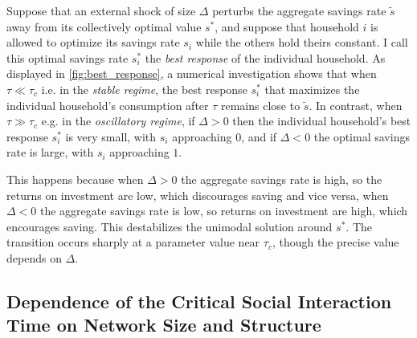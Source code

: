 Suppose that an external shock of size $\Delta$ perturbs the aggregate savings rate $\tilde{s}$ away from its collectively optimal value $s^\ast$, and suppose that household $i$ is allowed to optimize its savings rate $s_i$ while the others hold theirs constant. 
I call this optimal savings rate $s^*_i$ the \emph{best response} of the individual household. 
As displayed in \cref{fig:best_response}, a numerical investigation shows that when $\tau \ll \tau_{c}$ i.e. in the \emph{stable regime}, the best response $s^*_i$ that maximizes the individual household's consumption after $\tau$ remains close to $\tilde{s}$. 
In contrast, when  $\tau \gg \tau_{c}$ e.g. in the \emph{oscillatory regime}, if $\Delta > 0$ then the individual household's best response $s^*_i$ is very small, with $s_i$ approaching $0$, and if $\Delta < 0$ the optimal savings rate is large, with $s_i$ approaching $1$. 

This happens because when $\Delta > 0$ the aggregate savings rate is high, so the returns on investment are low, which discourages saving and vice versa, when $\Delta < 0$ the aggregate savings rate is low, so returns on investment are high, which encourages saving. 
This destabilizes the unimodal solution around $s^\ast$. 
The transition occurs sharply at a parameter value near $\tau_{c}$, though the precise value depends on $\Delta$.
\subsection{Dependence of the Critical Social Interaction Time on Network Size and Structure}  
\label{sec:savings_network_structure}


